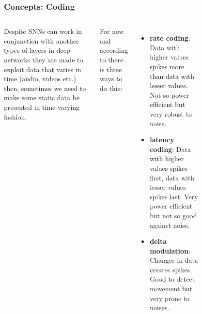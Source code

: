 \begin{frame}[allowframebreaks]
	\frametitle{Concepts: Coding}
	\begin{columns}
			\par Despite SNNs can work in conjunction with another types of layers in deep networks they are made to exploit data that varies in time (audio, videos etc.) then, sometimes we need to make some static data be presented in time-varying fashion.\newline
			
			\par For now and according to \cite{10242251} there is three ways to do this:
			\begin{itemize}
				\item \textbf{rate coding}: Data with higher values spikes more than data with lesser values. Not so power efficient but very robust to noise.
				\item \textbf{latency coding}: Data with higher values spikes first, data with lesser values spikes last. Very power efficient but not so good against noise.
				\item \textbf{delta modulation}: Changes in data creates spikes. Good to detect movement but very prone to noises.
			\end{itemize}
			\begin{figure}
				\centering

\end{figure}
\end{columns}
\end{frame}
